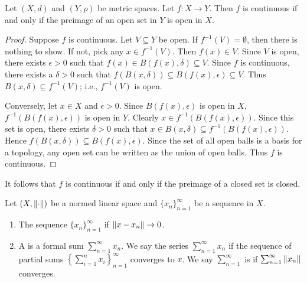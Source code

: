 \begin{proposition}
    Let $(X,d)$ and $(Y,\rho)$ be metric spaces. Let $f:X \rightarrow Y$. Then $f$ is continuous if and only if the preimage of an open set in $Y$ is open in $X$.
\end{proposition}
    \begin{proof}
        Suppose $f$ is continuous. Let $V \subseteq Y$ be open. If $f^{-1}(V) = \emptyset$, then there is nothing to show. If not, pick any $x \in f^{-1}(V)$. Then $f(x) \in V$. Since $V$ is open, there exists $\epsilon > 0$ such that $f(x) \in B(f(x), \delta) \subseteq V$. Since $f$ is continuous, there exists a $\delta > 0$ such that $f(B(x,\delta)) \subseteq B(f(x),\epsilon) \subseteq V$. Thus $B(x,\delta) \subseteq f^{-1}(V)$; i.e., $f^{-1}(V)$ is open.

        Conversely, let $x \in X$ and $\epsilon > 0$. Since $B(f(x),\epsilon)$ is open in $X$, $f^{-1}(B(f(x),\epsilon))$ is open in $Y$. Clearly $x \in f^{-1}(B(f(x),\epsilon))$. Since this set is open, there exists $\delta > 0$ such that $x \in B(x,\delta) \subseteq f^{-1}(B(f(x),\epsilon))$. Hence $f(B(x,\delta)) \subseteq B(f(x),\epsilon)$. Since the set of all open balls is a basis for a topology, any open set can be written as the union of open balls. Thus $f$ is continuous.
    \end{proof}

\begin{remark}
    It follows that $f$ is continuous if and only if the preimage of a closed set is closed.
\end{remark}

\begin{definition}
    Let $(X,\left\lVert \cdot\right\rVert)$ be a normed linear space and $\{x_n\}_{n = 1}^\infty$ be a sequence in $X$. 
    \begin{enumerate}[label = (\arabic*),itemsep=1pt,topsep=3pt]
        \item The sequence $\{x_n\}_{n = 1}^\infty$  if $\left\lVert x - x_n \right\rVert \rightarrow 0$.
        \item A  is a formal sum $\sum_{n = 1}^\infty x_n$. We say the series $\sum_{n = 1}^\infty x_n$   if the sequence of partial sums $\left\{ \sum_{i = 1}^n x_i \right\}_{n = 1}^\infty$ converges to $x$. We say $\sum_{n = 1}^\infty$ is \nl {} if $\sum_{n = 1}^\infty \left\lVert x_n \right\rVert$ converges.
    \end{enumerate}
\end{definition}

